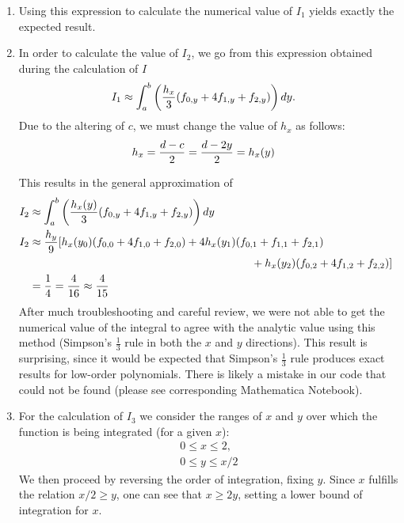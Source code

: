 \documentclass[12pt]{article}
\DeclarePairedDelimiter\rb{(}{)}
\begin{document}
\begin{enumerate}[label=(\alph*)]
    \item 
Using this expression to calculate the numerical value of \(I_{1}\) yields exactly the expected result.

\item 

In order to calculate the value of \(I_{2}\), we go from this expression obtained during the calculation of \(I\)
\begin{align*}
    I_{1} & \approx  \int_{a}^{b} {\rb*{\frac{h_{x}}{3} \rb*{f_{0,y} + 4 f_{1,y} + f_{2,y}}}} \,d y . &\\
\end{align*}
Due to the altering of \(c\), we must change the value of \(h_{x}\) as follows:
\begin{align*}
    h_{x} & = \frac{d - c}{2} = \frac{d - 2 y}{2} = h_{x} \rb*{y}&\\
\end{align*}

This results in the general approximation of 
\begin{align*}
    I_{2} & \approx  \int_{a}^{b} {\rb*{\frac{h_{x} \rb*{y}}{3} \rb*{f_{0,y} + 4 f_{1,y} + f_{2,y}}}} \,d y  &\\
    I_{2} & \approx \frac{h_{y}}{9} [
        h_{x}\rb*{y_{0}} \rb*{f_{0,0} + 4 f_{1,0} + f_{2,0}} +
        4 h_{x}\rb*{y_{1}} \rb*{f_{0,1} + f_{1,1} + f_{2,1}} &\\
& \hspace{200 px} + 
        h_{x}\rb*{y_{2}} \rb*{f_{0,2} + 4 f_{1,2} + f_{2,2}}
    ] &\\
    & = \frac{1}{4} = \frac{4}{16} \approx \frac{4}{15} &\\
\end{align*}
After much troubleshooting and careful review, we were not able to get the numerical value of the integral to agree with the analytic value using this method (Simpson's \(\frac{1}{3} \) rule in both the \(x\) and \(y\) directions). This result is surprising, since it would be expected that Simpson's \(\frac{1}{3}\) rule produces exact results for low-order polynomials. There is likely a mistake in our code that could not be found (please see corresponding Mathematica Notebook).

\item 
    For the calculation of \(I_{3}\) we consider the ranges of \(x\) and \(y\) over which the function is being integrated (for a given \(x\)):
    \begin{align*}
        & 0 \leq x \leq2, &\\
        & 0 \leq y \leq x/2 
    \end{align*}
    We then proceed by reversing the order of integration, fixing \(y\). Since \(x\) fulfills the relation \(x/2 \geq y\), one can see that \(x \geq 2y\), setting a lower bound of integration for \(x\).


\end{enumerate}
\end{document}
